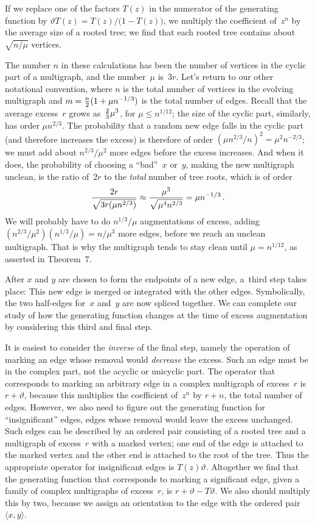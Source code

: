 If we replace one of the factors $T(z)$ in the numerator of the
generating function by $\vartheta T(z)=T(z)/\bigl(1-T(z)\bigr)$, we
multiply the coefficient of~$z^n$ by the average size of a rooted
tree; we find that each rooted tree contains about $\sqrt{n/\mu}$
vertices.

The number $n$ in these calculations has been the number of vertices
in the cyclic part of a multigraph, and the number~$\mu$ is~$3r$. Let's
return to our other notational convention, where $n$ is the total
number of vertices in the evolving multigraph and $m={n\over 2}(1+\mu
n^{-1/3})$ is the total number of edges. Recall that the average
excess~$r$ grows as~${2\over 3} \mu^3$, for $\mu\leq n^{1/12}$; the size of the
cyclic part, similarly, has order $\mu n^{2/3}$. The probability that
a random new edge falls in the cyclic part (and therefore increases
the excess) is therefore of order $(\mu n^{2/3}\!/n)^2=\mu^2n^{-2/3}$;
we must add about $n^{2/3}\!/\mu^2$ more edges before the excess
increases. And when it does, the probability of choosing a ``bad''~$x$
or~$y$, making the new multigraph unclean, is the ratio of~$2r$ to the {\it
total\/} number of tree roots, which is of order
$${2r\over \sqrt{3r(\mu n^{2/3})}}\approx{\mu^3\over\sqrt{\mu^4n^{2/3}}}
=\mu n^{-1/3}\,.$$
We will probably have to do $n^{1/3}\!/\mu$ augmentations of excess,
 adding $(n^{2/3}\!/\mu^2)(n^{1/3}\!/\mu)=n/\mu^3$ more edges, 
before we reach an unclean
multigraph. That is why the multigraph tends to stay clean until $\mu=n^{1/12}$,
as asserted in Theorem~7.

After $x$ and $y$ are chosen to form the endpoints of a new edge,
a~third step takes place: This new  edge is merged or integrated with
the other edges. 
Symbolically, the two half-edges for~$x$ and~$y$ are now spliced together.
We can complete our study of how the generating function changes at
the time of excess augmentation by considering this third and final
step.

It is easiest to consider the {\it inverse\/} of the final step,
namely the operation of marking an edge whose removal would {\it
decrease\/} the excess. Such an edge must be in the complex part, not
the acyclic or unicyclic
part. The operator that corresponds to marking an arbitrary
edge in a complex multigraph of excess~$r$ is $r+\vartheta$, because this
multiplies the coefficient of~$z^n$ by $r+n$, the total number of
edges. However, we also need to figure out the generating function for
``insignificant'' edges, edges whose removal would leave the excess
unchanged. Such edges can be described by an ordered pair consisting
of a rooted tree and a multigraph of excess~$r$ with a marked vertex; one
end of the edge is attached to the marked vertex and the other end is
attached to the root of the tree. Thus the appropriate operator for
insignificant edges is $T(z)\vartheta$. Altogether we find that the
generating function that corresponds to marking a significant edge, given
a family of complex multigraphs of excess~$r$, is $r+\vartheta
-T\vartheta$. We also should multiply this by two, because we assign
an orientation to the edge with the ordered pair $\langle x,y\rangle$.

